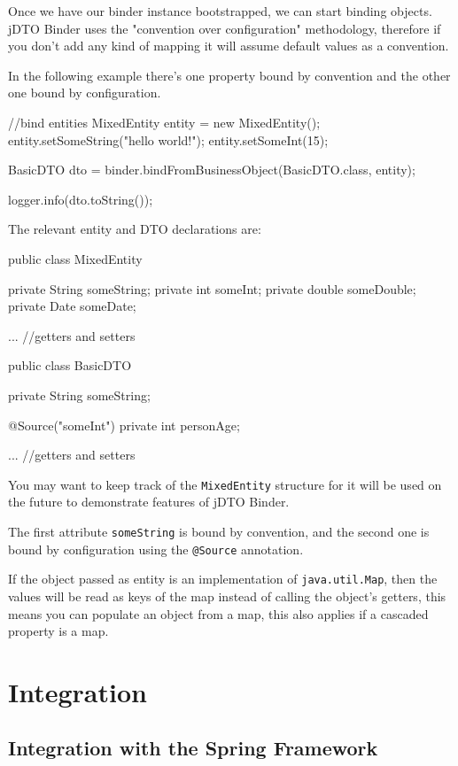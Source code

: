 \documentclass[11pt]{article}
\newcommand{\JDTO}{jDTO Binder\xspace}
\begin{document}
Once we have our binder instance bootstrapped, we can start binding objects. \JDTO uses the "convention over configuration"
methodology, therefore if you don't add any kind of mapping it will assume default values as a convention. 


In the following example there's one property bound by convention and the other one bound by configuration.


\begin{java}
//bind entities
MixedEntity entity = new MixedEntity();
entity.setSomeString("hello world!");
entity.setSomeInt(15);
        
BasicDTO dto = binder.bindFromBusinessObject(BasicDTO.class, entity);
        
logger.info(dto.toString());
\end{java}

The relevant entity and DTO declarations are:


\begin{java}
 public class MixedEntity {
    private String someString;
    private int someInt;
    private double someDouble;
    private Date someDate;
    
    ... //getters and setters
}

public class BasicDTO {
    private String someString;
    
    @Source("someInt")
    private int personAge;
    
    ... //getters and setters
}
\end{java}

You may want to keep track of the \texttt{MixedEntity} structure for it will be used on the future
to demonstrate features of \JDTO.

The first attribute \texttt{someString} is bound by convention, and the second one is bound
by configuration using the \texttt{@Source} annotation.

If the object passed as entity is an implementation of \texttt{java.util.Map}, then the values will be read as keys of the map instead of calling the object's getters, this means you can populate an object from a map, this also applies if a cascaded property is a map. 

\clearpage

\section{Integration}

\subsection{Integration with the Spring Framework}
\end{document}
